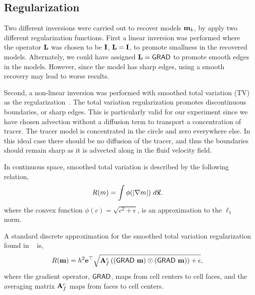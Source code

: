 \documentclass[final,leqno,onefignum,onetabnum]{siamltexmm}
\begin{document}
\subsection{Regularization}
Two different inversions were carried out to recover models ${\bf{m}}_k$, by apply two different regularization functions.  
First a linear inversion was performed where the operator ${\bf{L}}$ was chosen to be ${\bf{I}}$,  ${\bf{L}} = {\bf{I}}$, to promote smallness in the recovered models. Alternately, we could have assigned ${\bf{L}} = {\textsf{GRAD}}$ to promote smooth edges in the models. However, since the model has sharp edges, using a smooth recovery may lead to worse results. 

Second, a non-linear inversion was performed with smoothed total variation (TV) as the  regularization~\cite{Ascher2006}.
 The total variation regularization promotes discontinuous boundaries, or sharp edges. This is particularly valid for our experiment since we have chosen advection without a diffusion term to transport a concentration of tracer. The tracer model is  concentrated in the circle and zero everywhere else. In this ideal case there should be no diffusion of the tracer, and thus the boundaries should remain sharp as it is advected along in the fluid velocity field.

In continuous space, smoothed total variation is described by the following relation,
%
\begin{align}
		R(m) =  \int  \phi(|{\bf{ \nabla}} m|) \ d\vec {\bf x}.
\end{align} 
%
where the convex function $\phi(c) = \sqrt{c^2 + \epsilon}$, is an approximation to the $\ell_1$ norm. 

A standard discrete 
approximation for the smoothed total variation regularization found in ~\cite{Ascher2006} is, 
%
\begin{align}
\label{regsd}
R(\bfm) =  h^2 \bfe^{\top} \sqrt{ \bfA_{f}^{c} \left( (\GRADh\ \bfm) \odot (\GRADh\ \bfm) \right)  + \epsilon},
\end{align}
%
where the  gradient operator, ${\textsf{GRAD}}$,   maps from cell centers to cell faces, and the averaging matrix ${\bf{A}}_{f}^{c}$ maps from faces to cell centers. 
\end{document}
